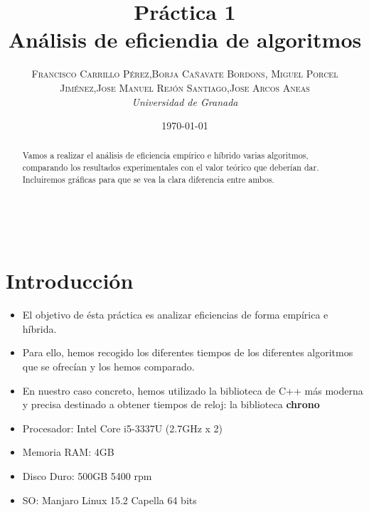 \documentclass[a4paper, 11pt]{article} %
\title{\textbf{Práctica 1}\\ %
Análisis de eficiendia de algoritmos} %
\author{\textsc{Francisco Carrillo Pérez,Borja Cañavate Bordons, Miguel Porcel Jiménez,Jose Manuel Rejón Santiago,Jose Arcos Aneas } %
\\{\textit{Universidad de Granada}}} %
\date{\today} %
\makeatletter
\renewcommand{\maketitle}{ %
\begin{flushright} %
{\LARGE\@title} %

\vspace{50pt} %

{\large\@author} %
\\\@date %

\vspace{40pt} %
\end{flushright}
}
\makeatother
\begin{document}
\maketitle %



\begin{abstract}
Vamos a realizar el análisis de eficiencia empírico e híbrido varias algoritmos, comparando los resultados experimentales con el valor
teórico que deberían dar. Incluiremos gráficas para que se vea la clara diferencia entre ambos.
\end{abstract}

\vspace{30pt} %


\section{Introducción }
\begin{frame}
	
	\begin{itemize}
		\item El objetivo de ésta práctica es analizar eficiencias de forma empírica e híbrida.
		\item Para ello, hemos recogido los diferentes tiempos de los diferentes algoritmos que se ofrecían y los hemos comparado.
		\item En nuestro caso concreto, hemos utilizado la biblioteca de C++ más moderna y precisa destinado a obtener tiempos de reloj: la biblioteca \textbf{chrono}
	\end{itemize}
\end{frame}
\begin{frame}
	
	\begin{itemize}
		
		\item Procesador: Intel Core i5-3337U (2.7GHz x 2)
		\item Memoria RAM: 4GB
		\item Disco Duro: 500GB 5400 rpm
		\item SO: Manjaro Linux 15.2 Capella 64 bits
	\end{itemize}
	
\end{frame}
\end{document}
